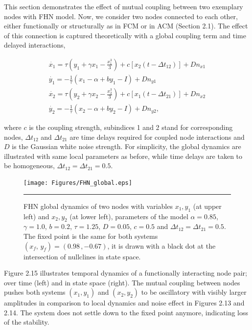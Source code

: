 This section demonstrates the effect of mutual coupling between two exemplary nodes with FHN model. Now, we consider two nodes connected to each other, either functionally or structurally as in FCM or in ACM (Section 2.1). The effect of this connection is captured theoretically with a global coupling term and time delayed interactions, 

\begin{subequations}
 \begin{align}\dot{x_1} = \tau \left( y_1 + \gamma x_1 - \frac{x_1^3}{3} \right) + c [x_2(t-\Delta t_{12})] +Dn_{x1} \label{eqn: frobenius 14}\\  \dot{y_1} = -\frac{1}{\tau} (x_1 - \alpha + b y_1 - I )+ Dn_{y1} \label{eqn: frobenius 15} \\ \dot{x_2} = \tau \left( y_2 + \gamma x_2 - \frac{x_2^3}{3} \right) + c [x_1(t-\Delta t_{21})] + Dn_{x2} \label{eqn: frobenius 16} \\  \dot{y_2} = -\frac{1}{\tau} (x_2 - \alpha + b y_2 - I ) + Dn_{y2} , \end{align} 
\end{subequations}
 
where $c$ is the coupling strength, subindices 1 and 2 stand for corresponding nodes, $\Delta t_{12}$ and $\Delta t_{21}$ are time delays required for coupled node interactions and $D$ is the Gaussian white noise strength. For simplicity, the global dynamics are illustrated with same local parameters as before, while time delays are taken to be homogeneous, $\Delta t_{12}=\Delta t_{21}=0.5$.

\begin{figure}[htbp]
  \centering
	\texttt{[image: Figures/FHN\_global.eps]}
 
    \rule{35em}{0.5pt}
    \caption[FHN Global]{FHN global dynamics of two nodes with variables $x_1,y_1$ (at upper left) and  $x_2,y_2$ (at lower left),  parameters of the model $\alpha=0.85$, $\gamma=1.0$, $b=0.2$, $\tau=1.25$, $D=0.05$, $c=0.5$ and $\Delta t_{12} = \Delta t_{21}=0.5$. The fixed point is the same for both systems $(x_f, \, y_f) = (0.98 \, , -0.67 )$, it is drawn with a black dot at the intersection of nullclines in state space.}
  \label{fig:FHN Global}	
\end{figure}

Figure 2.15 illustrates temporal dynamics of a functionally interacting node pair; over time (left) and in state space (right). The mutual coupling between nodes pushes both systems $(x_1,y_1)$ and $(x_2,y_2)$ to be oscillatory with visibly larger amplitudes in comparison to local dynamics and noise effect in Figures 2.13 and 2.14. The system does not settle down to the fixed point anymore, indicating loss of the stability. 

